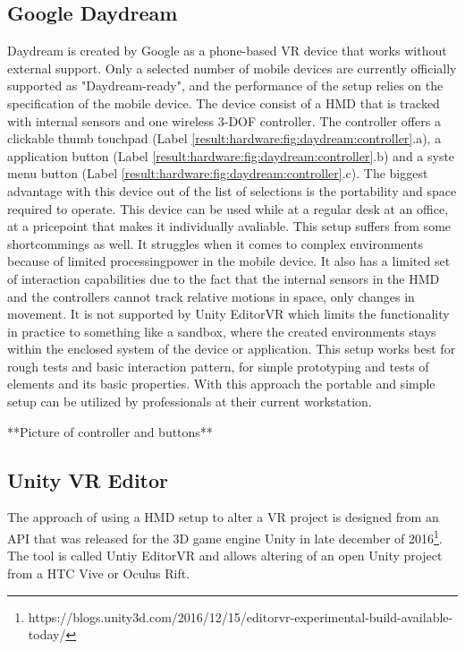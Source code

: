 \subsection{Google Daydream}
\label{result:hardware:daydream}
Daydream is created by Google as a phone-based VR device that works without external support. Only a selected number of mobile devices are currently officially supported as "Daydream-ready", and the performance of the setup relies on the specification of the mobile device. The device consist of a HMD that is tracked with internal sensors and one wireless 3-DOF controller. The controller offers a clickable thumb touchpad (Label \ref{result:hardware:fig:daydream:controller}.a), a application button (Label \ref{result:hardware:fig:daydream:controller}.b) and a syste menu button (Label \ref{result:hardware:fig:daydream:controller}.c). The biggest advantage with this device out of the list of selections is the portability and space required to operate. This device can be used while at a regular desk at an office, at a pricepoint that makes it individually avaliable. This setup suffers from some shortcommings as well. It struggles when it comes to complex environments because of limited processingpower in the mobile device. It also has a limited set of interaction capabilities due to the fact that the internal sensors in the HMD and the controllers cannot track relative motions in space, only changes in movement. It is not supported by Unity EditorVR which limits the functionality in practice to something like a sandbox, where the created environments stays within the enclosed system of the device or application.
This setup works best for rough tests and basic interaction pattern, for simple prototyping and tests of elements and its basic properties. With this approach the portable and simple setup can be utilized by professionals at their current workstation.

**Picture of controller and buttons**
\subsection{Unity VR Editor}
The approach of using a HMD setup to alter a VR project is designed from an API that was released for the 3D game engine Unity in late december of 2016\footnote{https://blogs.unity3d.com/2016/12/15/editorvr-experimental-build-available-today/}. The tool is called Untiy EditorVR and allows altering of an open Unity project from a HTC Vive or Oculus Rift.
